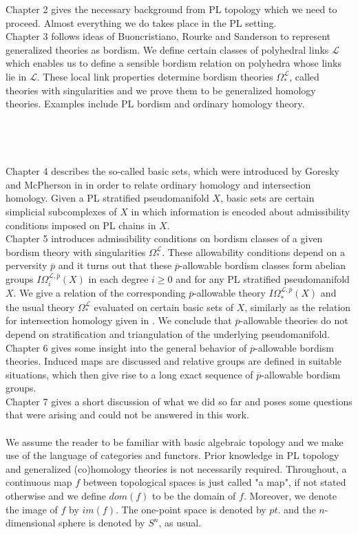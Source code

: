 \documentclass{scrreprt}
\begin{document}
Chapter 2 gives the necessary background from PL topology which we need to proceed. Almost everything we do takes place in the PL setting. \\
Chapter 3 follows ideas of Buoncristiano, Rourke and Sanderson to represent generalized theories as bordism. We define certain classes of polyhedral links $\mathcal{L}$ which enables us to define a sensible bordism relation on polyhedra whose links lie in $\mathcal{L}$. These local link properties determine bordism theories $\Omega_*^{\mathcal{L}}$, called theories with singularities and we prove them to be generalized homology theories. Examples include PL bordism and ordinary homology theory. \\ \\ \\ \\ \\
Chapter 4 describes the so-called basic sets, which were introduced by Goresky and McPherson in \cite{GM} in order to relate ordinary homology and intersection homology. Given a PL stratified pseudomanifold $X$, basic sets are certain simplicial subcomplexes of $X$ in which information is encoded about admissibility conditions imposed on PL chains in $X$. \\
Chapter 5 introduces admissibility conditions on bordism classes of a given bordism theory with singularities $\Omega_*^{\mathcal{L}}$. These allowability conditions depend on a perversity $\overline{p}$ and it turns out that these $\overline{p}$-allowable bordism classes form abelian groups $I\Omega_i^{\mathcal{L}, \overline{p}}(X)$ in each degree $i \geq 0$ and for any PL stratified pseudomanifold $X$. We give a relation of the corresponding $\overline{p}$-allowable theory $I\Omega_*^{\mathcal{L},\overline{p}}(X)$ and the usual theory $\Omega_*^{\mathcal{L}}$ evaluated on certain basic sets of $X$, similarly as the relation for intersection homology given in \cite{GM}. We conclude that $\overline{p}$-allowable theories do not depend on stratification and triangulation of the underlying pseudomanifold. \\
Chapter 6 gives some insight into the general behavior of $\overline{p}$-allowable bordism theories. Induced maps are discussed and relative groups are defined in suitable situations, which then give rise to a long exact sequence of $\overline{p}$-allowable bordism groups. \\
Chapter 7 gives a short discussion of what we did so far and poses some questions that were arising and could not be answered in this work. \\ \\
We assume the reader to be familiar with basic algebraic topology and we make use of the language of categories and functors. Prior knowledge in PL topology and generalized (co)homology theories is not necessarily required. Throughout, a continuous map $f$ between topological spaces is just called "a map", if not stated otherwise and we define $dom(f)$ to be the domain of $f$. Moreover, we denote the image of $f$ by $im(f)$. The one-point space is denoted by $pt.$ and the $n$-dimensional sphere is denoted by $S^n$, as usual.
\end{document}
